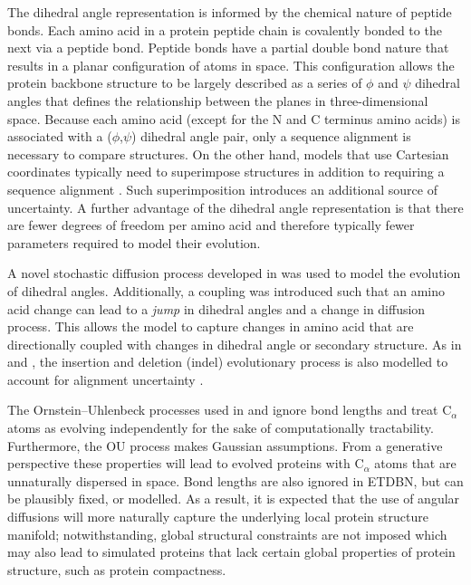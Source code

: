 \documentclass[nogrid]{MBE}%
\begin{document}
The dihedral angle representation is informed by the chemical nature of peptide bonds. Each amino acid in a protein peptide chain is covalently bonded to the next via a peptide bond. Peptide bonds have a partial double bond nature that results in a planar configuration of atoms in space. This configuration allows the protein backbone structure to be largely described as a series of $\phi$ and $\psi$ dihedral angles that defines the relationship between the planes in three-dimensional space. Because each amino acid (except for the N and C terminus amino acids) is associated with a ($\phi$,$\psi$) dihedral angle pair, only a sequence alignment is necessary to compare structures. On the other hand, models that use Cartesian coordinates typically need to superimpose structures in addition to requiring a sequence alignment \citep{herman2014simultaneous}. Such superimposition introduces an additional source of uncertainty. A further advantage of the dihedral angle representation is that there are fewer degrees of freedom per amino acid and therefore typically fewer parameters required to model their evolution.


A novel stochastic diffusion process developed in \citet{garciap2016diffusions} was used to model the evolution of dihedral angles. Additionally, a coupling was introduced such that an amino acid change can lead to a \textit{jump} in dihedral angles and a change in diffusion process. This allows the model to capture changes in amino acid that are directionally coupled with changes in dihedral angle or secondary structure. As in \citet{challis2012stochastic} and \citet{herman2014simultaneous}, the insertion and deletion (indel) evolutionary process is also modelled to account for alignment uncertainty \citep{thorne1992inching}.

The Ornstein--Uhlenbeck processes used in \citet{challis2012stochastic} and \citet{herman2014simultaneous} ignore bond lengths and treat $\text{C}_{\alpha}$ atoms as evolving independently for the sake of computationally tractability. Furthermore, the OU process makes Gaussian assumptions. From a generative perspective these properties will lead to evolved proteins with $\text{C}_{\alpha}$ atoms that are unnaturally dispersed in space. Bond lengths are also ignored in ETDBN, but can be plausibly fixed, or modelled. As a result, it is expected that the use of angular diffusions will more naturally capture the underlying local protein structure manifold; notwithstanding, global structural constraints are not imposed which may also lead to simulated proteins that lack certain global properties of protein structure, such as protein compactness.
\end{document}
